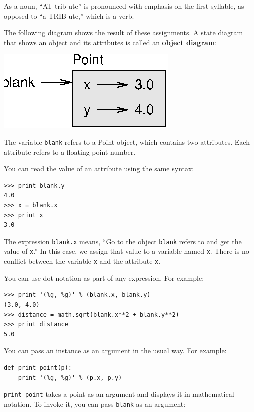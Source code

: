 \documentclass[10pt]{book}
\begin{document}
As a noun, ``AT-trib-ute'' is pronounced with emphasis on the first
syllable, as opposed to ``a-TRIB-ute,'' which is a verb.

The following diagram shows the result of these assignments.
A state diagram that shows an object and its attributes is
called an {\bf object diagram}:


\beforefig
\centerline{\includegraphics{figs/point.eps}}
\afterfig

The variable {\tt blank} refers to a Point object, which
contains two attributes.  Each attribute refers to a
floating-point number.

You can read the value of an attribute using the same syntax:

\beforeverb
\begin{verbatim}
>>> print blank.y
4.0
>>> x = blank.x
>>> print x
3.0
\end{verbatim}
\afterverb
%
The expression {\tt blank.x} means, ``Go to the object {\tt blank}
refers to and get the value of {\tt x}.'' In this case, we assign that
value to a variable named {\tt x}.  There is no conflict between
the variable {\tt x} and the attribute {\tt x}.

You can use dot notation as part of any expression.  For example:

\beforeverb
\begin{verbatim}
>>> print '(%g, %g)' % (blank.x, blank.y)
(3.0, 4.0)
>>> distance = math.sqrt(blank.x**2 + blank.y**2)
>>> print distance
5.0
\end{verbatim}
\afterverb
%
You can pass an instance as an argument in the usual way.
For example:


\beforeverb
\begin{verbatim}
def print_point(p):
    print '(%g, %g)' % (p.x, p.y)
\end{verbatim}
\afterverb
%
\verb"print_point" takes a point as an argument and displays it in
mathematical notation.  To invoke it, you can pass {\tt blank} as
an argument:
\end{document}

